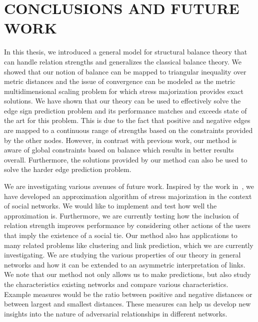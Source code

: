  
\chapter{CONCLUSIONS AND FUTURE WORK}
In this thesis, we introduced a general model for structural balance
theory that can handle relation strengths and generalizes the
classical balance theory. We showed that our notion of balance can be
mapped to triangular inequality over metric distances and the issue of
convergence can be modeled as the metric multidimensional scaling
problem for which stress majorization provides exact solutions. We
have shown that our theory can be used to effectively solve the edge
sign prediction problem and its performance matches and exceeds state
of the art for this problem. This is due to the fact that positive and
negative edges are mapped to a continuous range of strengths based on
the constraints provided by the other nodes. However, in contrast with
previous work, our method is aware of global constraints based on
balance which results in better results overall. Furthermore, the
solutions provided by our method can also be used to solve the harder
edge prediction problem.

We are investigating various avenues of future work. Inspired by the
work in~\cite{Khoury:12}, we have developed an approximation algorithm
of stress majorization in the context of social networks. We would like to implement and test how well the approximation is. Furthermore, we are currently testing how the inclusion of relation
strength improves performance by considering other actions of the
users that imply the existence of a social tie. Our method also has
applications to many related problems like clustering and link
prediction, which we are currently investigating. We are studying the
various properties of our theory in general networks and how it can be
extended to an asymmetric interpretation of links.  We note that our
method not only allows us to make predictions, but also study the
characteristics existing networks and compare various
characteristics. Example measures would be the ratio between positive
and negative distances or between largest and smallest
distances. These measures can help us develop new insights into the
nature of adversarial relationships in different networks.